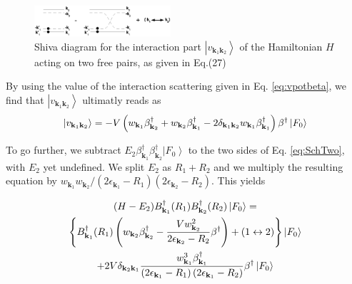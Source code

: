 \documentclass[aps,prb,superscriptaddress,showpacs,reprint,lengthcheck]{revtex4-1}
\begin{document}
\begin{figure}[htb]
   \includegraphics[width=0.45\textwidth]{twoPair.eps}
\caption{Shiva diagram for the interaction part $\left|v_{\mathbf{k} _1\mathbf{k} _2}\right>$ of the Hamiltonian $H$ acting on two free pairs, as given in Eq.(27)}
\label{fig:twoP}
\end{figure}

By using the value of the interaction scattering given in Eq.%
\eqref{eq:vpotbeta}, we find that $\left|v_{\mathbf{k} _1\mathbf{k}
_2}\right> $ ultimatly reads as
\begin{equation}
\left|v_{\mathbf{k} _1\mathbf{k} _2}\right> =-V\left(w_{\mathbf{k}
_1}\beta^{\dagger}_{\mathbf{k} _2}+w_{\mathbf{k} _2}\beta^{\dagger}_{\mathbf{%
k} _1}-2\delta_{\mathbf{k} _1\mathbf{k} _2}w_{\mathbf{k} _1}\beta^{\dagger}_{%
\mathbf{k} _1}\right) \beta^{\dagger}\left|F_0\right>  
\end{equation}

To go further, we subtract $E _2\beta^{\dagger}_{\mathbf{k}
_1}\beta^{\dagger}_{\mathbf{k} _2}\left|F_0\right>  $ to the two sides of Eq.%
\eqref{eq:SchTwo}, with $E _2$ yet undefined. We split $E _2$ as $R_1+R_2$ and we multiply
the resulting equation by $w_{\mathbf{k} _1}w_{\mathbf{k} _2}/\left(2%
\epsilon_{\mathbf{k} _1}-R_1\right) \left(2\epsilon_{\mathbf{k}
_2}-R_2\right) $. This yields


\begin{multline}  \label{eq:SchTwo2}
(H-E _2)B^{\dagger}_{\mathbf{k} _1}(R_1)B^{\dagger}_{\mathbf{k}
_2}(R_2)\left|F_0\right>   = \\
\left\{B^{\dagger}_{\mathbf{k} _1}(R_1)\left(w_{\mathbf{k}
_2}\beta^{\dagger}_{\mathbf{k} _2}-\frac{Vw_{\mathbf{k} _2}^2}{2\epsilon_{%
\mathbf{k} _2}-R_2}\beta^{\dagger}\right)+(1\leftrightarrow2)\right\}
\left|F_0\right>  \\
+2V\delta_{{\mathbf{k} _2}{\mathbf{k} _1}}\frac{w^3_{{\mathbf{k} _1}}\beta^\dagger_{{\mathbf{k} _1}}}{\left(2%
\epsilon_{\mathbf{k} _1}-R_1\right) \left(2\epsilon_{\mathbf{k}
_1}-R_2\right)}\beta^\dagger\left|F_0\right>  
\end{multline}
\end{document}
